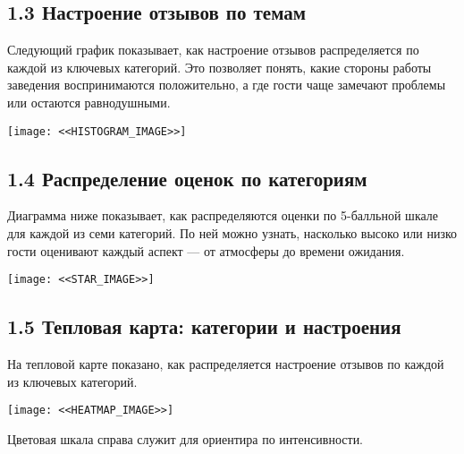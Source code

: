 \documentclass[a4paper,12pt]{extarticle}
\begin{document}
\subsection*{1.3 Настроение отзывов по темам}
\noindent
Следующий график показывает, как настроение отзывов распределяется по каждой из ключевых категорий.
Это позволяет понять, какие стороны работы заведения воспринимаются положительно, а где гости чаще замечают проблемы или остаются равнодушными.

\vspace{1em}
\begin{center}
    \texttt{[image: <<HISTOGRAM\_IMAGE>>]}
\end{center}
\vspace{1em}

\newpage

\subsection*{1.4 Распределение оценок по категориям}

\noindent
Диаграмма ниже показывает, как распределяются оценки по 5-балльной шкале для каждой из семи категорий.
По ней можно узнать, насколько высоко или низко гости оценивают каждый аспект — от атмосферы до времени ожидания.

\vspace{1em}
\begin{center}
    \texttt{[image: <<STAR\_IMAGE>>]}
\end{center}
\vspace{1em}

\noindent

\newpage


\subsection*{1.5 Тепловая карта: категории и настроения}

\noindent
На тепловой карте показано, как распределяется настроение отзывов по каждой из ключевых категорий.

\vspace{1em}
\begin{center}
    \texttt{[image: <<HEATMAP\_IMAGE>>]}
\end{center}
\vspace{1em}

\noindent
Цветовая шкала справа служит для ориентира по интенсивности.
\end{document}
